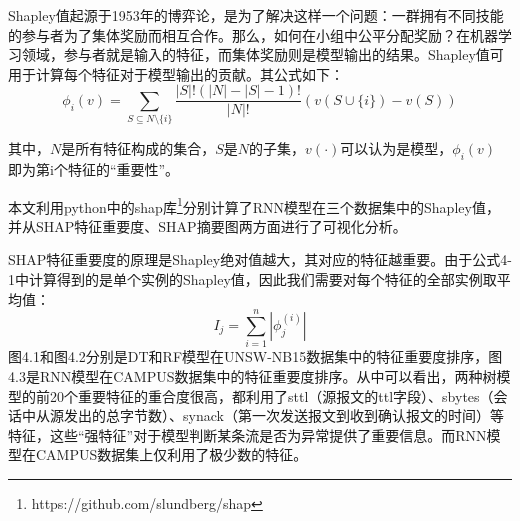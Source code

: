 

Shapley值起源于1953年的博弈论\cite{lundberg2018consistent}，是为了解决这样一个问题：一群拥有不同技能的参与者为了集体奖励而相互合作。那么，如何在小组中公平分配奖励？在机器学习领域，参与者就是输入的特征，而集体奖励则是模型输出的结果。Shapley值可用于计算每个特征对于模型输出的贡献。其公式如下： 
\begin{equation}
  \phi_i(v) = \sum_{S\subseteq N \setminus \{i\}} \frac{|S|! (|N| - |S| - 1)!}{|N|!}(v(S \cup \{i\}) - v(S))
\end{equation}

其中，$N$是所有特征构成的集合，$S$是$N$的子集，$v(\cdot)$可以认为是模型，$\phi_i(v)$ 即为第i个特征的“重要性”。

本文利用python中的shap库\footnote{https://github.com/slundberg/shap}分别计算了RNN模型在三个数据集中的Shapley值，并从SHAP特征重要度、SHAP摘要图两方面进行了可视化分析。

SHAP特征重要度的原理是Shapley绝对值越大，其对应的特征越重要。由于公式4-1中计算得到的是单个实例的Shapley值，因此我们需要对每个特征的全部实例取平均值：
\begin{equation}
  I_j = \sum_{i=1}^n |\phi_j^{(i)}|
\end{equation}
图4.1和图4.2分别是DT和RF模型在UNSW-NB15数据集中的特征重要度排序，图4.3是RNN模型在CAMPUS数据集中的特征重要度排序。从中可以看出，两种树模型的前20个重要特征的重合度很高，都利用了sttl（源报文的ttl字段）、sbytes（会话中从源发出的总字节数）、synack（第一次发送报文到收到确认报文的时间）等特征，这些“强特征”对于模型判断某条流是否为异常提供了重要信息。而RNN模型在CAMPUS数据集上仅利用了极少数的特征。




